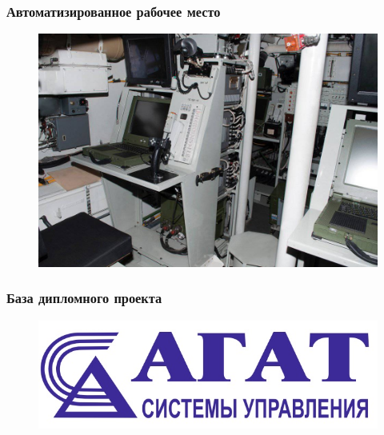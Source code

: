 \documentclass[luatex,mathserif,serif]{beamer}
\begin{document}
\begin{frame}
	\frametitle{Автоматизированное рабочее место}
	\begin{figure}[ht]
		\centering
		\includegraphics[scale=0.30]{arm}
	\end{figure}
\end{frame}

\begin{frame}
	\frametitle{База дипломного проекта}
	\begin{figure}[ht]
		\centering
		\includegraphics[scale=0.5]{agat}
	\end{figure}
\end{frame}
\end{document}

